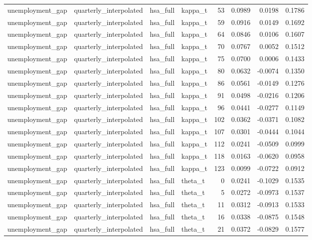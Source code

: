 \begin{tabular}{llllrrrr}
unemployment\_gap & quarterly\_interpolated & hsa\_full & kappa\_t & 53 & 0.0989 & 0.0198 & 0.1786 \\
unemployment\_gap & quarterly\_interpolated & hsa\_full & kappa\_t & 59 & 0.0916 & 0.0149 & 0.1692 \\
unemployment\_gap & quarterly\_interpolated & hsa\_full & kappa\_t & 64 & 0.0846 & 0.0106 & 0.1607 \\
unemployment\_gap & quarterly\_interpolated & hsa\_full & kappa\_t & 70 & 0.0767 & 0.0052 & 0.1512 \\
unemployment\_gap & quarterly\_interpolated & hsa\_full & kappa\_t & 75 & 0.0700 & 0.0006 & 0.1433 \\
unemployment\_gap & quarterly\_interpolated & hsa\_full & kappa\_t & 80 & 0.0632 & -0.0074 & 0.1350 \\
unemployment\_gap & quarterly\_interpolated & hsa\_full & kappa\_t & 86 & 0.0561 & -0.0149 & 0.1276 \\
unemployment\_gap & quarterly\_interpolated & hsa\_full & kappa\_t & 91 & 0.0498 & -0.0216 & 0.1206 \\
unemployment\_gap & quarterly\_interpolated & hsa\_full & kappa\_t & 96 & 0.0441 & -0.0277 & 0.1149 \\
unemployment\_gap & quarterly\_interpolated & hsa\_full & kappa\_t & 102 & 0.0362 & -0.0371 & 0.1082 \\
unemployment\_gap & quarterly\_interpolated & hsa\_full & kappa\_t & 107 & 0.0301 & -0.0444 & 0.1044 \\
unemployment\_gap & quarterly\_interpolated & hsa\_full & kappa\_t & 112 & 0.0241 & -0.0509 & 0.0999 \\
unemployment\_gap & quarterly\_interpolated & hsa\_full & kappa\_t & 118 & 0.0163 & -0.0620 & 0.0958 \\
unemployment\_gap & quarterly\_interpolated & hsa\_full & kappa\_t & 123 & 0.0099 & -0.0722 & 0.0912 \\
unemployment\_gap & quarterly\_interpolated & hsa\_full & theta\_t & 0 & 0.0241 & -0.1029 & 0.1535 \\
unemployment\_gap & quarterly\_interpolated & hsa\_full & theta\_t & 5 & 0.0272 & -0.0973 & 0.1537 \\
unemployment\_gap & quarterly\_interpolated & hsa\_full & theta\_t & 11 & 0.0312 & -0.0913 & 0.1533 \\
unemployment\_gap & quarterly\_interpolated & hsa\_full & theta\_t & 16 & 0.0338 & -0.0875 & 0.1548 \\
unemployment\_gap & quarterly\_interpolated & hsa\_full & theta\_t & 21 & 0.0372 & -0.0829 & 0.1577 \\

\end{tabular}
